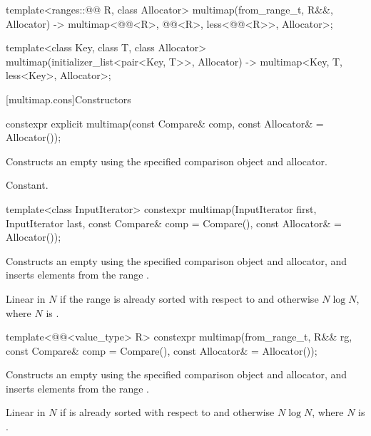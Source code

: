 \begin{codeblock}
{  template<ranges::@@ R, class Allocator>
    multimap(from_range_t, R&&, Allocator)
      -> multimap<@@<R>, @@<R>, less<@@<R>>, Allocator>;

  template<class Key, class T, class Allocator>
    multimap(initializer_list<pair<Key, T>>, Allocator)
      -> multimap<Key, T, less<Key>, Allocator>;
}
\end{codeblock}%
%

[multimap.cons]{Constructors}

%
\begin{itemdecl}
constexpr explicit multimap(const Compare& comp, const Allocator& = Allocator());
\end{itemdecl}

\begin{itemdescr}
\pnum
\effects
Constructs an empty
using the specified comparison object and allocator.

\pnum
\complexity
Constant.
\end{itemdescr}

%
\begin{itemdecl}
template<class InputIterator>
  constexpr multimap(InputIterator first, InputIterator last,
                     const Compare& comp = Compare(), const Allocator& = Allocator());
\end{itemdecl}

\begin{itemdescr}
\pnum
\effects
Constructs an empty
using the specified comparison object and allocator,
and inserts elements from the range
.

\pnum
\complexity
Linear in $N$ if the range
is already sorted with respect to 
and otherwise $N \log N$,
where $N$ is
.
\end{itemdescr}

%
\begin{itemdecl}
template<@@<value_type> R>
  constexpr multimap(from_range_t, R&& rg,
                     const Compare& comp = Compare(), const Allocator& = Allocator());
\end{itemdecl}

\begin{itemdescr}
\pnum
\effects
Constructs an empty 
using the specified comparison object and allocator, and
inserts elements from the range .

\pnum
\complexity
Linear in $N$ if  is already sorted with respect to  and
otherwise $N \log N$, where $N$ is .
\end{itemdescr}

